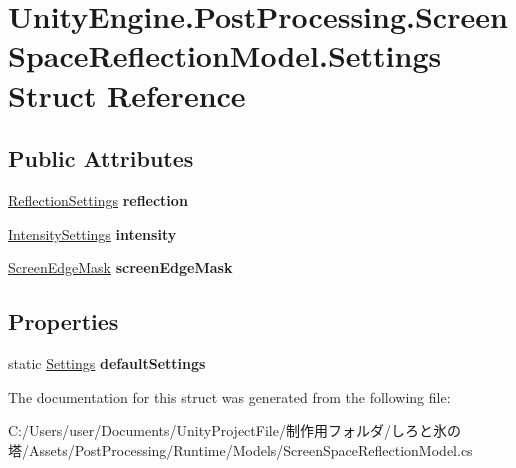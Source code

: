 \hypertarget{struct_unity_engine_1_1_post_processing_1_1_screen_space_reflection_model_1_1_settings}{}\section{Unity\+Engine.\+Post\+Processing.\+Screen\+Space\+Reflection\+Model.\+Settings Struct Reference}
\label{struct_unity_engine_1_1_post_processing_1_1_screen_space_reflection_model_1_1_settings}
\subsection*{Public Attributes}
\begin{DoxyCompactItemize}
\item 
\mbox{\label{struct_unity_engine_1_1_post_processing_1_1_screen_space_reflection_model_1_1_settings_af5e50a060b8a92557f3b27f0ecbcf1f0}} 
\hyperlink{struct_unity_engine_1_1_post_processing_1_1_screen_space_reflection_model_1_1_reflection_settings}{Reflection\+Settings} {\bfseries reflection}
\item 
\mbox{\label{struct_unity_engine_1_1_post_processing_1_1_screen_space_reflection_model_1_1_settings_a379bc477aa7fa436d6838f6919017b2a}} 
\hyperlink{struct_unity_engine_1_1_post_processing_1_1_screen_space_reflection_model_1_1_intensity_settings}{Intensity\+Settings} {\bfseries intensity}
\item 
\mbox{\label{struct_unity_engine_1_1_post_processing_1_1_screen_space_reflection_model_1_1_settings_a3cb099eb427c211492d905039c26d337}} 
\hyperlink{struct_unity_engine_1_1_post_processing_1_1_screen_space_reflection_model_1_1_screen_edge_mask}{Screen\+Edge\+Mask} {\bfseries screen\+Edge\+Mask}
\end{DoxyCompactItemize}
\subsection*{Properties}
\begin{DoxyCompactItemize}
\item 
\mbox{\label{struct_unity_engine_1_1_post_processing_1_1_screen_space_reflection_model_1_1_settings_a911d8f7c6b2e2dddaea49dc9ae8db8b0}} 
static \hyperlink{struct_unity_engine_1_1_post_processing_1_1_screen_space_reflection_model_1_1_settings}{Settings} {\bfseries default\+Settings}
\end{DoxyCompactItemize}


The documentation for this struct was generated from the following file\+:\begin{DoxyCompactItemize}
\item 
C\+:/\+Users/user/\+Documents/\+Unity\+Project\+File/制作用フォルダ/しろと氷の塔/\+Assets/\+Post\+Processing/\+Runtime/\+Models/Screen\+Space\+Reflection\+Model.\+cs\end{DoxyCompactItemize}
